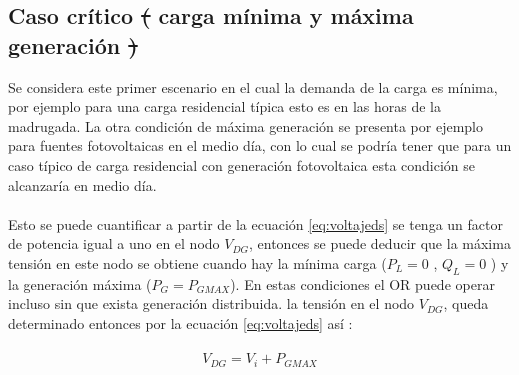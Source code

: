 \documentclass[12pt, letterpaper]{report}
\providecommand{\DIFdeltex}[1]{{\protect\color{red}\sout{#1}}}                      %
\providecommand{\DIFdelbegin}{} %
\providecommand{\DIFdelend}{} %
\providecommand{\DIFdel}[1]{\texorpdfstring{\DIFdeltex{#1}}{}} %
\begin{document}
\subsection{Caso crítico \DIFdelbegin \DIFdel{( }\DIFdelend carga mínima  y máxima generación \DIFdelbegin \DIFdel{) }\DIFdelend }
Se considera este primer escenario en el cual la demanda de la carga es mínima, por ejemplo  para una carga residencial típica  esto es  en las horas de la madrugada. La otra condición de máxima generación se presenta por ejemplo para fuentes fotovoltaicas  en el medio día,  con lo cual se podría tener que para un caso típico de carga residencial con generación fotovoltaica esta condición se alcanzaría en medio día.\\\\
Esto se puede  cuantificar a partir de la ecuación \ref{eq:voltajeds} se tenga un factor de potencia igual a uno  en el nodo  $V_{DG}$, entonces se puede deducir que la máxima tensión en este nodo se obtiene cuando hay la mínima carga ($P_{L} = 0$ , $Q_{L} = 0$ )  y la generación máxima ($P_{G} = P_{GMAX}$). En estas condiciones el OR puede operar incluso sin que exista generación distribuida. la tensión en el nodo $V_{DG}$, queda determinado entonces por la ecuación \ref{eq:voltajeds} así \cite{strbac2002integration} :\\\\
\begin{equation}
V_{DG} = V_{i} + P_{GMAX}
\label{eq:vgmax}
\end{equation}
\end{document}
